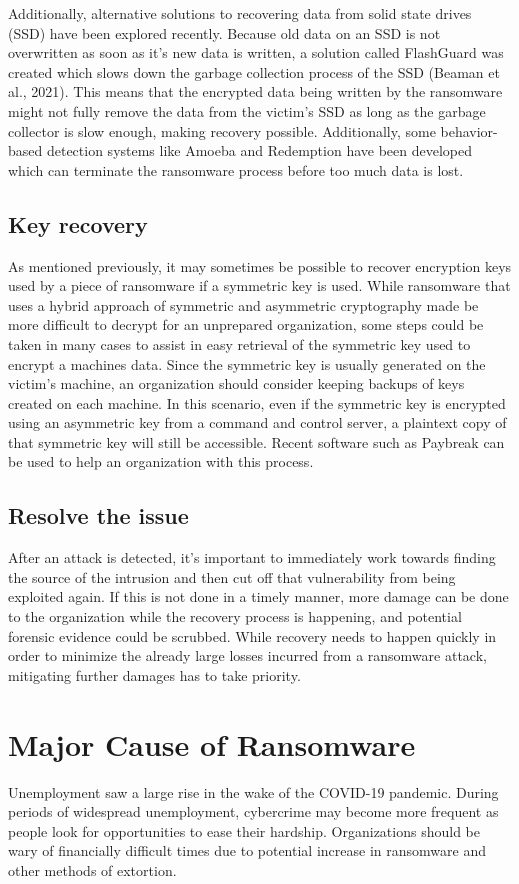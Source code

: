 \documentclass[11pt]{article}
\begin{document}
Additionally, alternative solutions to recovering data from solid state drives (SSD) have been explored recently. Because old data on an SSD is not overwritten as soon as it's new data is written, a solution called FlashGuard was created which slows down the garbage collection process of the SSD (Beaman et al., 2021). This means that the encrypted data being written by the ransomware might not fully remove the data from the victim's SSD as long as the garbage collector is slow enough, making recovery possible. Additionally, some behavior-based detection systems like Amoeba and Redemption have been developed which can terminate the ransomware process before too much data is lost.

\subsection{Key recovery}
\label{sec:org8bdeb1a}
As mentioned previously, it may sometimes be possible to recover encryption keys used by a piece of ransomware if a symmetric key is used. While ransomware that uses a hybrid approach of symmetric and asymmetric cryptography made be more difficult to decrypt for an unprepared organization, some steps could be taken in many cases to assist in easy retrieval of the symmetric key used to encrypt a machines data. Since the symmetric key is usually generated on the victim's machine, an organization should consider keeping backups of keys created on each machine. In this scenario, even if the symmetric key is encrypted using an asymmetric key from a command and control server, a plaintext copy of that symmetric key will still be accessible. Recent software such as Paybreak can be used to help an organization with this process.

\subsection{Resolve the issue}
\label{sec:orgaadd467}
After an attack is detected, it's important to immediately work towards finding the source of the intrusion and then cut off that vulnerability from being exploited again. If this is not done in a timely manner, more damage can be done to the organization while the recovery process is happening, and potential forensic evidence could be scrubbed. While recovery needs to happen quickly in order to minimize the already large losses incurred from a ransomware attack, mitigating further damages has to take priority.

\section{Major Cause of Ransomware}
\label{sec:org30f6c49}
Unemployment saw a large rise in the wake of the COVID-19 pandemic. During periods of widespread unemployment, cybercrime may become more frequent as people look for opportunities to ease their hardship. Organizations should be wary of financially difficult times due to potential increase in ransomware and other methods of extortion.
\end{document}

